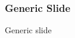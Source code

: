 \begin{frame} \frametitle{Generic Slide}
  \small
  \begin{cenpage}{105mm}\setlength{\baselineskip}{11pt}
    
    Generic slide
    
    \vmm \vmm
    
  \end{cenpage}
  \vfill
\end{frame} 
